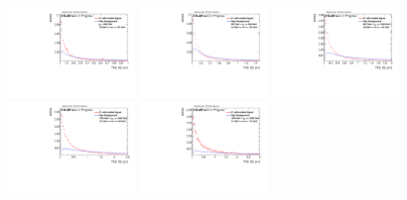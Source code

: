 \begin{figure}
\bigskip
\includegraphics[width=0.3\textwidth]{sascha_input/Appendix/Distributions/higgs/distributions/beta3/h_assisted_tj_D2_3_bin1.pdf} \hspace{1mm}
\includegraphics[width=0.3\textwidth]{sascha_input/Appendix/Distributions/higgs/distributions/beta3/h_assisted_tj_D2_3_bin2.pdf} \hspace{4mm}
\includegraphics[width=0.3\textwidth]{sascha_input/Appendix/Distributions/higgs/distributions/beta3/h_assisted_tj_D2_3_bin3.pdf} 
\bigskip
\includegraphics[width=0.3\textwidth]{sascha_input/Appendix/Distributions/higgs/distributions/beta3/h_assisted_tj_D2_3_bin4.pdf} \hspace{4mm}
\includegraphics[width=0.3\textwidth]{sascha_input/Appendix/Distributions/higgs/distributions/beta3/h_assisted_tj_D2_3_bin5.pdf} 


\end{figure}
